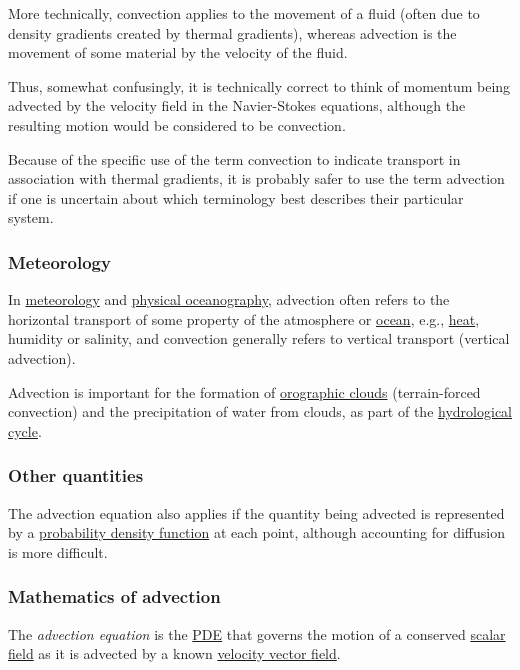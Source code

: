 \documentclass{article}
\begin{document}
More technically, convection applies to the movement of a fluid (often due to density gradients created by thermal gradients), whereas advection is the movement of some material by the velocity of the fluid.

Thus, somewhat confusingly, it is technically correct to think of momentum being advected by the velocity field in the Navier-Stokes equations, although the resulting motion would be considered to be convection.

Because of the specific use of the term convection to indicate transport in association with thermal gradients, it is probably safer to use the term advection if one is uncertain about which terminology best describes their particular system.

\subsubsection{Meteorology}
In \href{https://en.wikipedia.org/wiki/Meteorology}{meteorology} and \href{https://en.wikipedia.org/wiki/Physical_oceanography}{physical oceanography}, advection often refers to the horizontal transport of some property of the atmosphere or \href{https://en.wikipedia.org/wiki/Ocean}{ocean}, e.g., \href{https://en.wikipedia.org/wiki/Heat}{heat}, humidity or salinity, and convection generally refers to vertical transport (vertical advection).

Advection is important for the formation of \href{https://en.wikipedia.org/wiki/Orographic_cloud}{orographic clouds} (terrain-forced convection) and the precipitation of water from clouds, as part of the \href{https://en.wikipedia.org/wiki/Hydrological_cycle}{hydrological cycle}.

\subsubsection{Other quantities}
The advection equation also applies if the quantity being advected is represented by a \href{https://en.wikipedia.org/wiki/Probability_density_function}{probability density function} at each point, although accounting for diffusion is more difficult.

\subsubsection{Mathematics of advection}
The \textit{advection equation} is the \href{https://en.wikipedia.org/wiki/Partial_differential_equation}{PDE} that governs the motion of a conserved \href{https://en.wikipedia.org/wiki/Scalar_field}{scalar field} as it is advected by a known \href{https://en.wikipedia.org/wiki/Velocity_field}{velocity vector field}.
\end{document}
